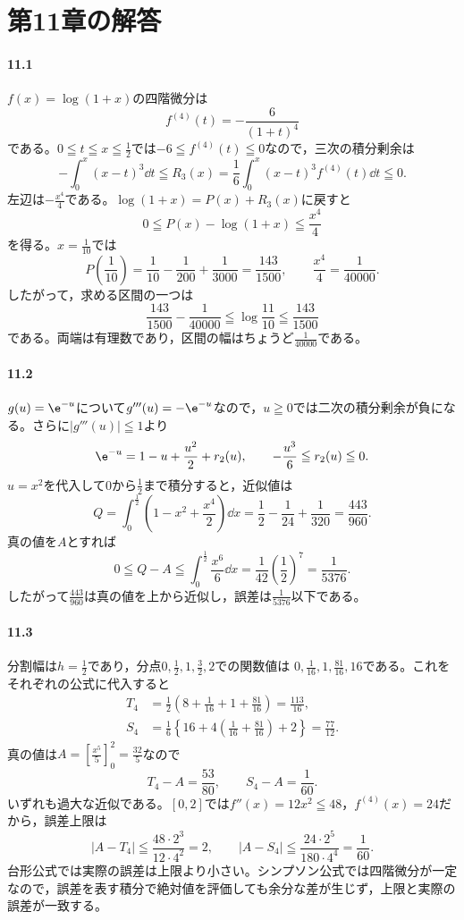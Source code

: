 \section{第11章の解答}\label{解答:第11章}

\paragraph{11.1}
$f(x)=\log(1+x)$の四階微分は
\[
 f^{(4)}(t)=-\frac6{(1+t)^4}
\]
である。$0\leqq t\leqq x\leqq\frac12$では$-6\leqq f^{(4)}(t)\leqq0$なので，三次の積分剰余は
\[
 -\int_0^x(x-t)^3\dd t
 \leqq R_3(x)=\frac16\int_0^x(x-t)^3f^{(4)}(t)\dd t
 \leqq0.
\]
左辺は$-\frac{x^4}{4}$である。$\log(1+x)=P(x)+R_3(x)$に戻すと
\[
 0\leqq P(x)-\log(1+x)\leqq\frac{x^4}{4}
\]
を得る。$x=\frac1{10}$では
\[
 P\left(\frac1{10}\right)
 =\frac1{10}-\frac1{200}+\frac1{3000}
 =\frac{143}{1500},\qquad
 \frac{x^4}{4}=\frac1{40000}.
\]
したがって，求める区間の一つは
\[
 \boxed{\frac{143}{1500}-\frac1{40000}
 \leqq\log\frac{11}{10}\leqq\frac{143}{1500}}
\]
である。両端は有理数であり，区間の幅はちょうど$\frac1{40000}$である。

\paragraph{11.2}
$g(u)=\e^{-u}$について$g'''(u)=-\e^{-u}$なので，$u\geqq0$では二次の積分剰余が負になる。さらに$|g'''(u)|\leqq1$より
\[
 \e^{-u}=1-u+\frac{u^2}{2}+r_2(u),
 \qquad -\frac{u^3}{6}\leqq r_2(u)\leqq0.
\]
$u=x^2$を代入して$0$から$\frac12$まで積分すると，近似値は
\[
 Q=\int_0^{\frac12}\left(1-x^2+\frac{x^4}{2}\right)\dd x
 =\frac12-\frac1{24}+\frac1{320}
 =\frac{443}{960}.
\]
真の値を$A$とすれば
\[
 0\leqq Q-A
 \leqq\int_0^{\frac12}\frac{x^6}{6}\dd x
 =\frac1{42}\left(\frac12\right)^7
 =\frac1{5376}.
\]
したがって$\frac{443}{960}$は真の値を上から近似し，誤差は$\frac1{5376}$以下である。

\paragraph{11.3}
分割幅は$h=\frac12$であり，分点$0,\frac12,1,\frac32,2$での関数値は
$0,\frac1{16},1,\frac{81}{16},16$である。これをそれぞれの公式に代入すると
\[
 \begin{aligned}
 T_4&=\frac12\left(8+\frac1{16}+1+\frac{81}{16}\right)
 =\frac{113}{16},\\
 S_4&=\frac16\left\{16+4\left(\frac1{16}+\frac{81}{16}\right)+2\right\}
 =\frac{77}{12}.
 \end{aligned}
\]
真の値は$A=\left[\frac{x^5}{5}\right]_0^2=\frac{32}{5}$なので
\[
 T_4-A=\frac{53}{80},\qquad S_4-A=\frac1{60}.
\]
いずれも過大な近似である。$[0,2]$では$f''(x)=12x^2\leqq48$，$f^{(4)}(x)=24$だから，誤差上限は
\[
 |A-T_4|\leqq\frac{48\cdot2^3}{12\cdot4^2}=2,
 \qquad
 |A-S_4|\leqq\frac{24\cdot2^5}{180\cdot4^4}=\frac1{60}.
\]
台形公式では実際の誤差は上限より小さい。シンプソン公式では四階微分が一定なので，誤差を表す積分で絶対値を評価しても余分な差が生じず，上限と実際の誤差が一致する。

